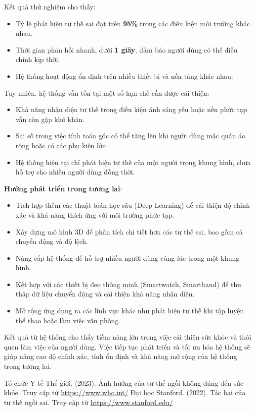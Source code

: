 \documentclass[conference]{IEEEtran}
\begin{document}
Kết quả thử nghiệm cho thấy:
\begin{itemize}
    \item Tỷ lệ phát hiện tư thế sai đạt trên \textbf{95\%} trong các điều kiện môi trường khác nhau.
    \item Thời gian phản hồi nhanh, dưới \textbf{1 giây}, đảm bảo người dùng có thể điều chỉnh kịp thời.
    \item Hệ thống hoạt động ổn định trên nhiều thiết bị và nền tảng khác nhau.
\end{itemize}

Tuy nhiên, hệ thống vẫn tồn tại một số hạn chế cần được cải thiện:
\begin{itemize}
    \item Khả năng nhận diện tư thế trong điều kiện ánh sáng yếu hoặc nền phức tạp vẫn còn gặp khó khăn.
    \item Sai số trong việc tính toán góc có thể tăng lên khi người dùng mặc quần áo rộng hoặc có các phụ kiện lớn.
    \item Hệ thống hiện tại chỉ phát hiện tư thế của một người trong khung hình, chưa hỗ trợ cho nhiều người dùng đồng thời.
\end{itemize}

\textbf{Hướng phát triển trong tương lai}:
\begin{itemize}
    \item Tích hợp thêm các thuật toán học sâu (Deep Learning) để cải thiện độ chính xác và khả năng thích ứng với môi trường phức tạp.
    \item Xây dựng mô hình 3D để phân tích chi tiết hơn các tư thế sai, bao gồm cả chuyển động và độ lệch.
    \item Nâng cấp hệ thống để hỗ trợ nhiều người dùng cùng lúc trong một khung hình.
    \item Kết hợp với các thiết bị đeo thông minh (Smartwatch, Smartband) để thu thập dữ liệu chuyển động và cải thiện khả năng nhận diện.
    \item Mở rộng ứng dụng ra các lĩnh vực khác như phát hiện tư thế khi tập luyện thể thao hoặc làm việc văn phòng.
\end{itemize}

Kết quả từ hệ thống cho thấy tiềm năng lớn trong việc cải thiện sức khỏe và thói quen làm việc của người dùng. Việc tiếp tục phát triển và tối ưu hóa hệ thống sẽ giúp nâng cao độ chính xác, tính ổn định và khả năng mở rộng của hệ thống trong tương lai.


\begin{thebibliography}{1}
 Tổ chức Y tế Thế giới. (2023). Ảnh hưởng của tư thế ngồi không đúng đến sức khỏe. Truy cập từ \url{https://www.who.int/}
 Đại học Stanford. (2022). Tác hại của tư thế ngồi sai. Truy cập từ \url{https://www.stanford.edu/}
\end{thebibliography}
\end{document}
